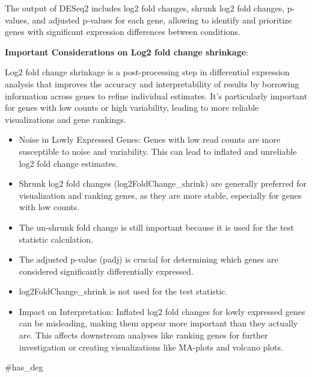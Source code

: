 \documentclass{article}
\begin{document}
The output of DESeq2 includes log2 fold changes, shrunk log2 fold changes, p-values, and adjusted p-values for each gene, allowing
to identify and prioritize genes with significant expression differences between conditions.

\textbf{Important Considerations on Log2 fold change shrinkage}:

Log2 fold change shrinkage is a post-processing step in differential expression analysis that improves the accuracy and interpretability
of results by borrowing information across genes to refine individual estimates. It's particularly important for genes with low counts
or high variability, leading to more reliable visualizations and gene rankings.

\begin{itemize}
  \item Noise in Lowly Expressed Genes: Genes with low read counts are more susceptible to noise and variability. This can lead to inflated and unreliable log2 fold change estimates.
  \item Shrunk log2 fold changes (log2FoldChange\_shrink) are generally preferred for visualization and ranking genes, as they are more stable, especially for genes with low counts.
  \item The un-shrunk fold change is still important because it is used for the test statistic calculation.
  \item The adjusted p-value (padj) is crucial for determining which genes are considered significantly differentially expressed.
  \item log2FoldChange\_shrink is not used for the test statistic.
  \item Impact on Interpretation: Inflated log2 fold changes for lowly expressed genes can be misleading, making them appear more important than they actually are. This affects
  downstream analyses like ranking genes for further investigation or creating visualizations like MA-plots and volcano plots.
\end{itemize}

{{#has_deg}}
\end{document}
